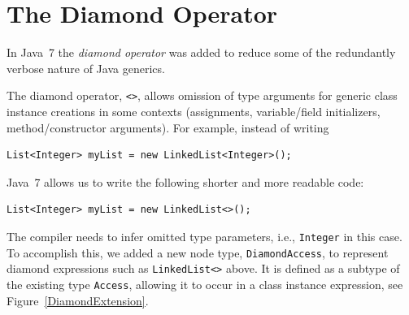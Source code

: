 {%


\section{The Diamond Operator}
\label{Diamond}

In Java~7 the \emph{diamond operator} was added to reduce some of the
redundantly verbose nature of Java generics.

The diamond operator, \verb'<>', allows omission of type arguments for generic
class instance creations in some contexts (assignments, variable/field
initializers, method/constructor arguments). For example, instead of writing

\begin{lstlisting}
List<Integer> myList = new LinkedList<Integer>();
\end{lstlisting}

\noindent
Java~7 allows us to write the following shorter and more readable code:

\begin{lstlisting}
List<Integer> myList = new LinkedList<>();
\end{lstlisting}


\noindent
The compiler needs to infer omitted type parameters, i.e., \texttt{Integer} in
this case. To accomplish this, we added a new node type, \verb'DiamondAccess',
to represent diamond expressions such as \texttt{LinkedList<>} above.  It is
defined as a subtype of the existing type \verb'Access', allowing it to occur
in a class instance expression, see Figure~\ref{DiamondExtension}.

}
